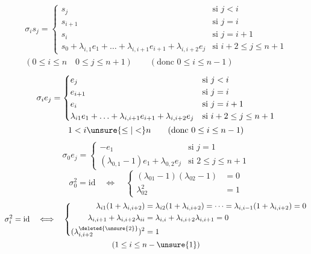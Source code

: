 \[
\begin{gathered}
\sigma_i s_j=\begin{cases}s_j&\text{si }j<i\\s_{i+1}&\text{si }j=i\\s_i&\text{si }j=i+1\\s_0+\lambda_{i,1}e_1+\ldots+\lambda_{i,i+1}e_{i+1}+\lambda_{i,i+2}e_j&\text{si }i+2\leq j\leq n+1\end{cases}\\
(0\leq i\leq n\quad0\leq j\leq n+1)\qquad(\text{donc }0\leq i\leq n-1)
\end{gathered}
\]
\[
\begin{gathered}
\sigma_i e_j=\begin{cases}e_j&\text{si }j<i\\e_{i+1}&\text{si }j=i\\e_i&\text{si }j=i+1\\\lambda_{i1}e_1+\ldots+\lambda_{i,i+1}e_{i+1}+\lambda_{i,i+2}e_j&\text{si }i+2\leq j\leq n+1\end{cases}\\
1<i\unsure{\leq|<}n\qquad(\text{donc }0\leq i\leq n-1)
\end{gathered}
\]
\[
\sigma_0e_j=\begin{cases}-e_1&\text{si }j=1\\(\lambda_{0,1}-1)e_1+\lambda_{0,2}e_j&\text{si }2\leq j\leq n+1\end{cases}
\]
\[
\sigma_0^2=\mathrm{id}\quad\Longleftrightarrow\quad\left\{\begin{aligned}(\lambda_{01}-1)(\lambda_{02}-1)&=0\\\lambda_{02}^2&=1\end{aligned}\right.
\]
\[
\begin{gathered}
\sigma_i^2=\mathrm{id}\quad\Longleftrightarrow\quad\left\{\begin{aligned}
\lambda_{i1}(1+\lambda_{i,i+2})&=\lambda_{i2}(1+\lambda_{i,i+2})=\cdots=\lambda_{i,i-1}(1+\lambda_{i,i+2})=0\\
\lambda_{i,i+1}+\lambda_{i,i+2}\lambda_{ii}&=\lambda_{i,i}+\lambda_{i,i+2}\lambda_{i,i+1}=0\\
(\lambda_{i,i+2}^{\deleted{\unsure{2}}})^2&=1
\end{aligned}\right.\\
(1\leq i\leq n-\unsure{1})
\end{gathered}
\]


